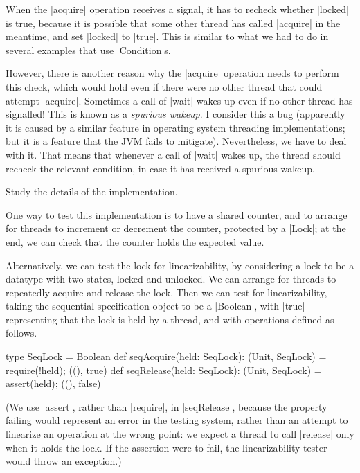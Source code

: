When the |acquire| operation receives a signal, it has to recheck whether
|locked| is true, because it is possible that some other thread has called
|acquire| in the meantime, and set |locked| to |true|.  This is similar to
what we had to do in several examples that use |Condition|s.

However, there is another reason why the |acquire| operation needs to perform
this check, which would hold even if there were no other thread that could
attempt |acquire|.  Sometimes a call of |wait| wakes up even if no other
thread has signalled!  This is known as a \emph{spurious
  wakeup}.  I consider this a bug (apparently it is
caused by a similar feature in operating system threading implementations; but
it is a feature that the JVM fails to mitigate).  Nevertheless, we have to
deal with it.  That means that whenever a call of |wait| wakes up, the thread
should recheck the relevant condition, in case it has received a spurious
wakeup.

\begin{instruction}
Study the details of the implementation.
\end{instruction}

One way to test this implementation is to have a shared counter, and to
arrange for threads to increment or decrement the counter, protected by
a |Lock|; at the end, we can check that the counter holds the expected value.

Alternatively, we can test the lock for linearizability, by considering a lock
to be a datatype with two states, {locked} and {unlocked}.  We can arrange for
threads to repeatedly acquire and release the lock.  Then we can test for
linearizability, taking the sequential specification object to be a |Boolean|,
with |true| representing that the lock is held by a thread, and with
operations defined as follows.
%
\begin{scala}
  type SeqLock = Boolean
  def seqAcquire(held: SeqLock): (Unit, SeqLock) = { require(!held); ((), true) }
  def seqRelease(held: SeqLock): (Unit, SeqLock) = { assert(held); ((), false) }
\end{scala}
%
(We use |assert|, rather than |require|, in |seqRelease|, because the property
failing would represent an error in the testing system, rather than an attempt
to linearize an operation at the wrong point: we expect a thread to call
|release| only when it holds the lock.  If the assertion were to fail, the
linearizability tester would throw an exception.)

